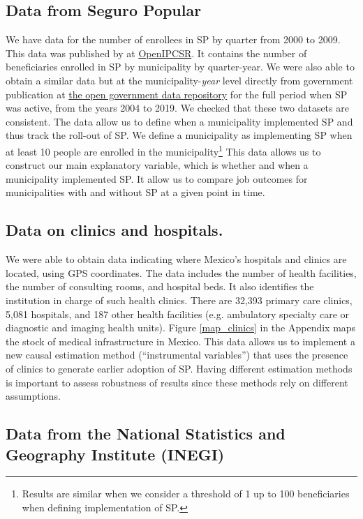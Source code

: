 \documentclass[oneside,11pt]{article}
\begin{document}
\subsection{Data from Seguro Popular}

We have data for the number of enrollees in SP by quarter from 2000 to 2009. This data was published by \cite{Campos} at \href{https://www.openicpsr.org/openicpsr/project/114886/version/V1/view}{OpenIPCSR}. It contains the number of beneficiaries enrolled in SP by municipality by quarter-year. We were also able to obtain a similar data but at the municipality-\textit{year} level directly from government publication at \href{http://datos.gob.mx/busca/dataset/beneficiarios-de-proteccion-social-en-salud-de-seguro-popular}{the open government data repository} for the full period when SP was active, from the years 2004 to 2019. We checked that these two datasets are consistent. The data allow us to define when a municipality implemented SP and thus track the roll-out of SP. We define a municipality as implementing SP when at least 10 people are enrolled in the municipality\footnote{Results are similar when we consider a threshold of 1 up to 100 beneficiaries when defining implementation of SP.} This data allows us to construct our main explanatory variable, which is whether and when a municipality implemented SP. It allow us to compare job outcomes for municipalities with and without SP at a given point in time.

\subsection{Data on clinics and hospitals.} We were able to obtain data indicating where  Mexico's hospitals and clinics are located, using GPS coordinates. The data includes the number of health facilities, the number of consulting rooms, and hospital beds. It also identifies the institution in charge of such health clinics. There are 32,393 primary care clinics, 5,081  hospitals, and 187 other health facilities (e.g. ambulatory specialty care or diagnostic and imaging health units). Figure \ref{map_clinics} in the Appendix maps the stock of medical infrastructure in Mexico. This data allows us to implement a new causal estimation method (``instrumental variables'') that uses the presence of clinics to generate earlier adoption of SP. Having different estimation methods is important to assess robustness of results since these methods rely on different assumptions.


\subsection{Data from the National Statistics and Geography Institute (INEGI)}
\end{document}
